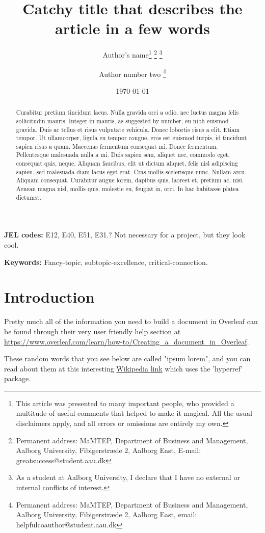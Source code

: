 \documentclass[english,a4paper,12pt]{article}
\title{Catchy title that describes the article in a few words}
\author{Author's name\thanks{This article was presented to many important people, who provided a multitude of useful comments that helped to make it magical. All the usual disclaimers apply, and all errors or omissions are entirely my own.}
\thanks{Permanent address: MaMTEP, Department of Business and Management, Aalborg University, Fibigerstr{\ae}de 2, Aalborg East, E-mail: greatsuccess@student.aau.dk}
\thanks{As a student at Aalborg University, I declare that I have no external or internal conflicts of interest.}
\and Author number two
\thanks{Permanent address: MaMTEP, Department of Business and Management, Aalborg University, Fibigerstr{\ae}de 2, Aalborg East, email: helpfulcoauthor@student.aau.dk}}
\date{\today}
\begin{document}
\linespread{1.0}
\selectfont
\begin{titlepage}
\maketitle
\vspace{2 cm}
\begin{abstract}
\noindent
Curabitur pretium tincidunt lacus. Nulla gravida orci a odio.  nec luctus magna felis sollicitudin mauris. Integer in mauris, as suggested by \cite{baekelbeck2015, bjerg2016} number, eu nibh euismod gravida. Duis ac tellus et risus vulputate vehicula. Donec lobortis risus a elit. Etiam tempor. Ut ullamcorper, ligula eu tempor congue, eros est euismod turpis, id tincidunt sapien risus a quam. Maecenas fermentum consequat mi. Donec fermentum. Pellentesque malesuada nulla a mi. Duis sapien sem, aliquet nec, commodo eget, consequat quis, neque. Aliquam faucibus, elit ut dictum aliquet, felis nisl adipiscing sapien, sed malesuada diam lacus eget erat. Cras mollis scelerisque nunc. Nullam arcu. Aliquam consequat. Curabitur augue lorem, dapibus quis, laoreet et, pretium ac, nisi. Aenean magna nisl, mollis quis, molestie eu, feugiat in, orci. In hac habitasse platea dictumst.
\end{abstract}

\begin{flushleft}
\small{
\vspace{2cm}


\textbf{JEL codes:} E12, E40, E51, E31.? Not necessary for a project, but they look cool.

\vspace{1cm}
\textbf{Keywords:} Fancy-topic, subtopic-excellence, critical-connection.
}
\end{flushleft}
\end{titlepage}

\linespread{1.5}
\selectfont

\section{Introduction}

Pretty much all of the information you need to build a document in Overleaf can be found through their very user friendly help section at \url{https://www.overleaf.com/learn/how-to/Creating_a_document_in_Overleaf}.


These random words that you see below are called "ipsum lorem", and you can read about them at this interesting \href{https://en.wikipedia.org/wiki/Lorem_ipsum}{Wikipedia link}  which uses the 'hyperref' package.
\end{document}
